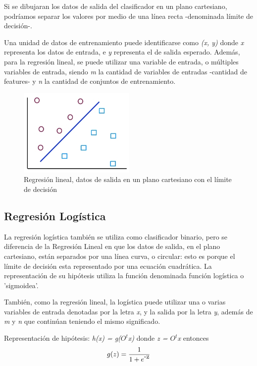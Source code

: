 \documentclass[a4paper,12pt,oneside,spanish]{book}
\begin{document}
Si se dibujaran los datos de salida del clasificador en un plano cartesiano, podríamos separar los valores por medio de una línea recta -denominada límite de decisión-. \par

Una unidad de datos de entrenamiento puede identificarse como \textit{(x, y)} donde \textit{x} representa los datos de entrada, e \textit{y} representa el de salida esperado. Además, para la regresión lineal, se puede utilizar una variable de entrada, o múltiples variables de entrada, siendo \textit{m} la cantidad de variables de entradas -cantidad de features- y \textit{n} la cantidad de conjuntos de entrenamiento.  \par

\begin{figure}[h!]
	\includegraphics[width=160pt]{Imagenes/regresion1.jpg}
	\centering
	\caption{Regresión lineal, datos de salida en un plano cartesiano con el límite de decisión}
	\label{fig:regresion1}
\end{figure}


\subsection{Regresión Logística}

La regresión logística también se utiliza como clasificador binario, pero se diferencia de la Regresión Lineal en que los datos de salida, en el plano cartesiano, están separados por una línea curva, o circular: esto es porque el límite de decisión esta representado por una ecuación cuadrática. La representación de su hipótesis utiliza la función denominada función logística o 'sigmoidea'. \par

También, como la regresión lineal, la logística puede utilizar una o varias variables de entrada denotadas por la letra \textit{x}, y la salida por la letra \textit{y}, además de \textit{m} y \textit{n} que continúan teniendo el mismo significado. \par

Representación de hipótesis: \textit{h(x) = g($O^t$x)}
donde \textit{z = $O^t$x}
entonces 
\begin{equation}
	g(z) = \frac{1}{1 + e\raisebox{1ex}{-z}} 
\end{equation}
\end{document}
